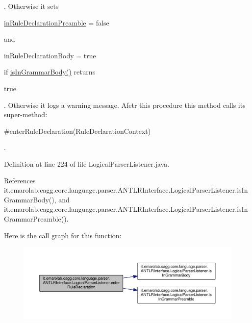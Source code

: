  . Otherwise it sets
\begin{DoxyCode}
\hyperlink{classit_1_1emarolab_1_1cagg_1_1core_1_1language_1_1parser_1_1ANTLRInterface_1_1LogicalParserListener_a5484654862060db14379a9ea8088da3d}{inRuleDeclarationPreamble} = \textcolor{keyword}{false} 
\end{DoxyCode}
 and
\begin{DoxyCode}
inRuleDeclarationBody = \textcolor{keyword}{true} 
\end{DoxyCode}
 if \hyperlink{classit_1_1emarolab_1_1cagg_1_1core_1_1language_1_1parser_1_1ANTLRInterface_1_1LogicalParserListener_a8d3ea8540f3041cd39900d56c5160b54}{is\-In\-Grammar\-Body()} returns
\begin{DoxyCode}
\textcolor{keyword}{true} 
\end{DoxyCode}
 . Otherwise it logs a warning message. Afetr this procedure this method calls its super-\/method\-: 
\begin{DoxyCode}
\textcolor{preprocessor}{#enterRuleDeclaration(RuleDeclarationContext) }
\end{DoxyCode}
 . 

Definition at line 224 of file Logical\-Parser\-Listener.\-java.



References it.\-emarolab.\-cagg.\-core.\-language.\-parser.\-A\-N\-T\-L\-R\-Interface.\-Logical\-Parser\-Listener.\-is\-In\-Grammar\-Body(), and it.\-emarolab.\-cagg.\-core.\-language.\-parser.\-A\-N\-T\-L\-R\-Interface.\-Logical\-Parser\-Listener.\-is\-In\-Grammar\-Preamble().



Here is the call graph for this function\-:\nopagebreak
\begin{figure}[H]
\begin{center}
\leavevmode
\includegraphics[width=350pt]{classit_1_1emarolab_1_1cagg_1_1core_1_1language_1_1parser_1_1ANTLRInterface_1_1LogicalParserListener_a2fab3cd21aefb1d5c46d0e7d6e8a5823_cgraph}
\end{center}
\end{figure}


